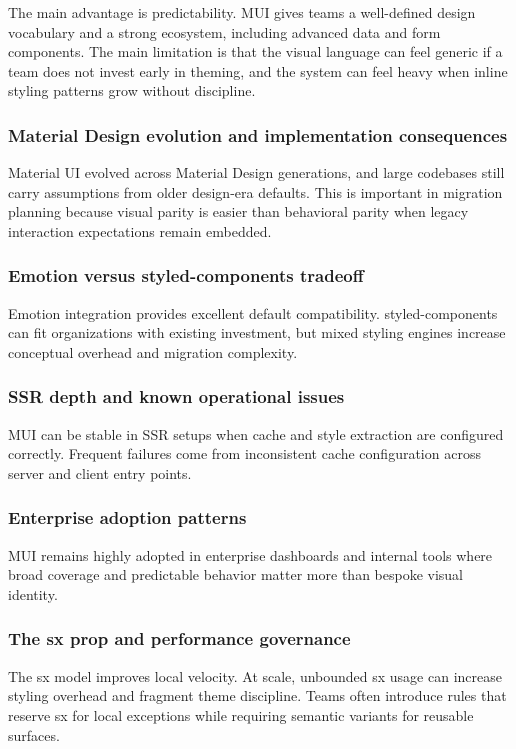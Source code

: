 \documentclass[11pt,twoside,a4paper]{article}
\begin{document}
The main advantage is predictability. MUI gives teams a well-defined design vocabulary and a strong ecosystem, including advanced data and form components. The main limitation is that the visual language can feel generic if a team does not invest early in theming, and the system can feel heavy when inline styling patterns grow without discipline.

\subsubsection{Material Design evolution and implementation consequences}
Material UI evolved across Material Design generations, and large codebases still carry assumptions from older design-era defaults. This is important in migration planning because visual parity is easier than behavioral parity when legacy interaction expectations remain embedded.

\subsubsection{Emotion versus styled-components tradeoff}
Emotion integration provides excellent default compatibility. styled-components can fit organizations with existing investment, but mixed styling engines increase conceptual overhead and migration complexity.

\subsubsection{SSR depth and known operational issues}
MUI can be stable in SSR setups when cache and style extraction are configured correctly. Frequent failures come from inconsistent cache configuration across server and client entry points.

\subsubsection{Enterprise adoption patterns}
MUI remains highly adopted in enterprise dashboards and internal tools where broad coverage and predictable behavior matter more than bespoke visual identity.

\subsubsection{The sx prop and performance governance}
The sx model improves local velocity. At scale, unbounded sx usage can increase styling overhead and fragment theme discipline. Teams often introduce rules that reserve sx for local exceptions while requiring semantic variants for reusable surfaces.
\end{document}
